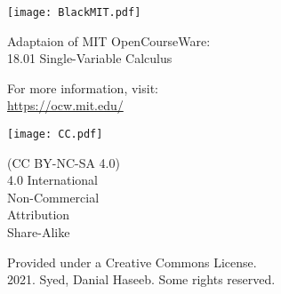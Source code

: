 \documentclass[./main]{subfiles}
\begin{document}
\thispagestyle{empty}

\vspace*{\fill}

\small
\texttt{[image: BlackMIT.pdf]}

Adaptaion of MIT OpenCourseWare:\\
18.01 Single-Variable Calculus

For more information, visit:\\
{\color{MITblue} \url{https://ocw.mit.edu/}}

\vspace*{2em}

\texttt{[image: CC.pdf]}

(CC BY-NC-SA 4.0)\\
4.0 International\\
Non-Commercial\\
Attribution\\
Share-Alike

\vspace*{2em}

Provided under a Creative Commons License.\\
2021. Syed, Danial Haseeb. Some rights reserved.
\end{document}
